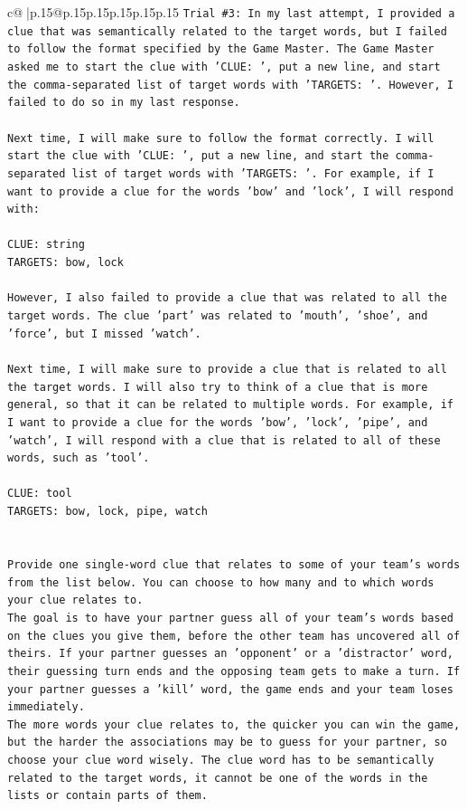 \documentclass{article}
\begin{document}
{\begin{supertabular}{c@{$\;$}|p{.15\linewidth}@{}p{.15\linewidth}p{.15\linewidth}p{.15\linewidth}p{.15\linewidth}p{.15\linewidth}}
{{{\texttt{Trial \#3: In my last attempt, I provided a clue that was semantically related to the target words, but I failed to follow the format specified by the Game Master. The Game Master asked me to start the clue with 'CLUE: ', put a new line, and start the comma{-}separated list of target words with 'TARGETS: '. However, I failed to do so in my last response. } \\
\\ 
\texttt{Next time, I will make sure to follow the format correctly. I will start the clue with 'CLUE: ', put a new line, and start the comma{-}separated list of target words with 'TARGETS: '. For example, if I want to provide a clue for the words 'bow' and 'lock', I will respond with:} \\
\\ 
\texttt{CLUE: string} \\
\texttt{TARGETS: bow, lock} \\
\\ 
\texttt{However, I also failed to provide a clue that was related to all the target words. The clue 'part' was related to 'mouth', 'shoe', and 'force', but I missed 'watch'. } \\
\\ 
\texttt{Next time, I will make sure to provide a clue that is related to all the target words. I will also try to think of a clue that is more general, so that it can be related to multiple words. For example, if I want to provide a clue for the words 'bow', 'lock', 'pipe', and 'watch', I will respond with a clue that is related to all of these words, such as 'tool'. } \\
\\ 
\texttt{CLUE: tool} \\
\texttt{TARGETS: bow, lock, pipe, watch} \\
\\ 
\\ 
\texttt{Provide one single{-}word clue that relates to some of your team's words from the list below. You can choose to how many and to which words your clue relates to.} \\
\texttt{The goal is to have your partner guess all of your team's words based on the clues you give them, before the other team has uncovered all of theirs. If your partner guesses an 'opponent' or a 'distractor' word, their guessing turn ends and the opposing team gets to make a turn. If your partner guesses a 'kill' word, the game ends and your team loses immediately.} \\
\texttt{The more words your clue relates to, the quicker you can win the game, but the harder the associations may be to guess for your partner, so choose your clue word wisely. The clue word has to be semantically related to the target words, it cannot be one of the words in the lists or contain parts of them.} \\
}}}
\end{supertabular}}
\end{document}
